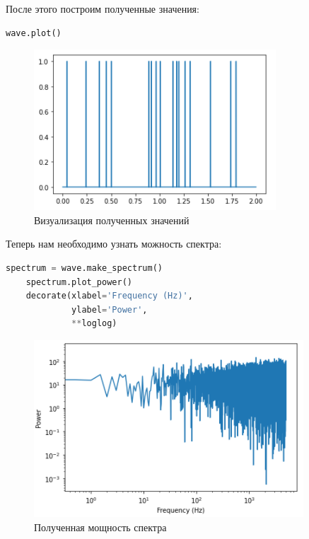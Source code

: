 \documentclass[a4paper]{article}
\begin{document}
            После этого построим полученные значения:
            
\begin{lstlisting}[language=Python, caption= Визуализация полученных значений]
    wave.plot()
\end{lstlisting}               
            
            \begin{figure}[H]
                \centering
                \includegraphics{ex_4_signal_wave_plot.png}
                \caption{Визуализация полученных значений}
                \label{fig:ex_4_signal_wave_plot}
            \end{figure}
            
            Теперь нам необходимо узнать можность спектра:
            
\begin{lstlisting}[language=Python, caption= Мощность спектра]
    spectrum = wave.make_spectrum()
    spectrum.plot_power()
    decorate(xlabel='Frequency (Hz)',
             ylabel='Power',
             **loglog)
\end{lstlisting}               
            
            \begin{figure}[H]
                \centering
                \includegraphics{ex_4_signal_log_spectr.png}
                \caption{Полученная мощность спектра}
                \label{fig:ex_4_signal_log_spectr}
            \end{figure}
            
\end{document}
